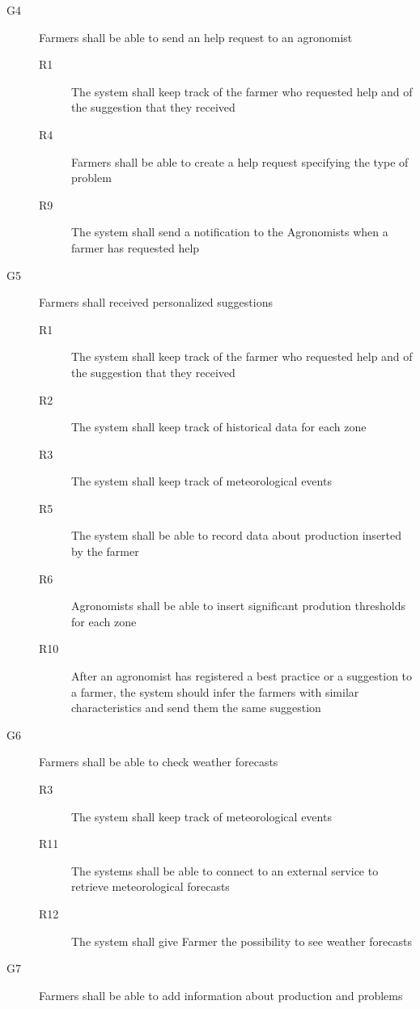 \begin{description}
\begin{description}
        \end{description}
    \item [G4] Farmers shall be able to send an help request to an agronomist
        \begin{description}
            \item[R1] The system shall keep track of the farmer who requested help and of the suggestion that they received
            \item[R4] Farmers shall be able to create a help request specifying  the type of problem
            \item[R9] The system shall send a notification to the Agronomists when a farmer has requested help
        \end{description}
    \item [G5] Farmers shall received personalized suggestions
        \begin{description}
            \item[R1] The system shall keep track of the farmer who requested help and of the suggestion that they received
            \item[R2] The system shall keep track of historical data for each zone
            \item[R3] The system shall keep track of meteorological events
            \item[R5] The system shall be able to record data about production inserted by the farmer
            \item[R6] Agronomists shall be able to insert significant prodution thresholds for each zone
            \item[R10] After an agronomist has registered a best practice or a suggestion to a farmer, the system should infer the farmers with similar characteristics and send them the same suggestion 
        \end{description}
    \item [G6] Farmers shall be able to check weather forecasts
        \begin{description}
            \item[R3] The system shall keep track of meteorological events
            \item[R11] The systems shall be able to connect to an external service to retrieve meteorological forecasts
            \item[R12] The system shall give Farmer the possibility to see weather forecasts
        \end{description}
    \item [G7] Farmers shall be able to add information about production and problems

\end{description}

